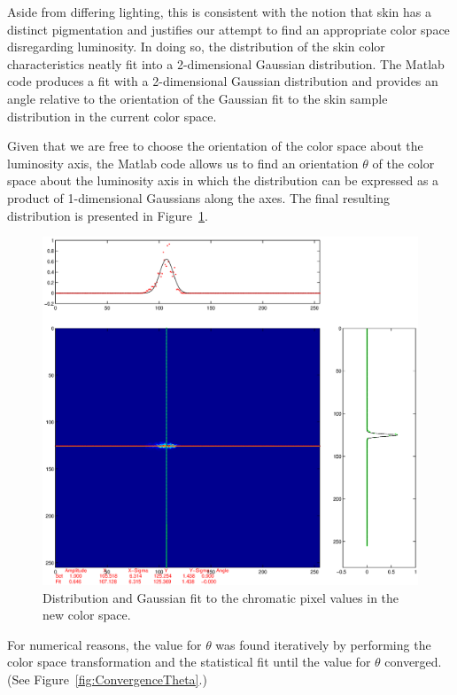 Aside from differing lighting, this is consistent with the notion that skin has a distinct pigmentation and justifies our attempt to find an appropriate color space disregarding luminosity. In doing so, the distribution of the skin color characteristics neatly fit into a 2-dimensional Gaussian distribution. The Matlab code produces a fit with a 2-dimensional Gaussian distribution and provides an angle relative to the orientation of the Gaussian fit to the skin sample distribution in the current color space.

Given that we are free to choose the orientation of the color space about the luminosity axis, the Matlab code allows us to find an orientation $\theta$ of the color space about the luminosity axis in which the distribution can be expressed as a product of 1-dimensional Gaussians along the axes. The final resulting distribution is presented in Figure~\ref{fig:DistributionAndGaussianFit}.


\begin{figure}[h!]
  \centering
    \includegraphics[width=\textwidth]{Chapter2/Figs/crosshairFigureFinal.eps}
    \caption{Distribution and Gaussian fit to the chromatic pixel values in the new color space.}  \label{fig:DistributionAndGaussianFit}
\end{figure}


For numerical reasons, the value for $\theta$ was found iteratively by performing the color space transformation and the statistical fit until the value for $\theta$ converged. (See Figure~\ref{fig:ConvergenceTheta}.)


